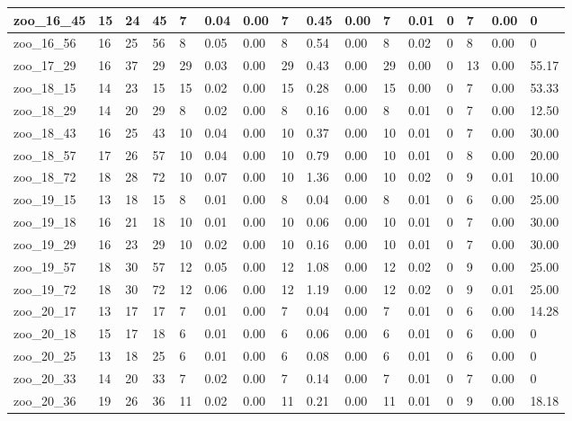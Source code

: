 \begin{landscape}
\begin{longtable}{llllllllllllllll}
zoo\_16\_45 & 15 & 24 & 45 & 7 & 0.04 & 0.00 & 7 & 0.45 & 0.00 & 7 & 0.01 & 0 & 7 & 0.00 & 0 \\ \hline 
zoo\_16\_56 & 16 & 25 & 56 & 8 & 0.05 & 0.00 & 8 & 0.54 & 0.00 & 8 & 0.02 & 0 & 8 & 0.00 & 0 \\ \hline 
zoo\_17\_29 & 16 & 37 & 29 & 29 & 0.03 & 0.00 & 29 & 0.43 & 0.00 & 29 & 0.00 & 0 & 13 & 0.00 & 55.17 \\ \hline 
zoo\_18\_15 & 14 & 23 & 15 & 15 & 0.02 & 0.00 & 15 & 0.28 & 0.00 & 15 & 0.00 & 0 & 7 & 0.00 & 53.33 \\ \hline 
zoo\_18\_29 & 14 & 20 & 29 & 8 & 0.02 & 0.00 & 8 & 0.16 & 0.00 & 8 & 0.01 & 0 & 7 & 0.00 & 12.50 \\ \hline 
zoo\_18\_43 & 16 & 25 & 43 & 10 & 0.04 & 0.00 & 10 & 0.37 & 0.00 & 10 & 0.01 & 0 & 7 & 0.00 & 30.00 \\ \hline 
zoo\_18\_57 & 17 & 26 & 57 & 10 & 0.04 & 0.00 & 10 & 0.79 & 0.00 & 10 & 0.01 & 0 & 8 & 0.00 & 20.00 \\ \hline 
zoo\_18\_72 & 18 & 28 & 72 & 10 & 0.07 & 0.00 & 10 & 1.36 & 0.00 & 10 & 0.02 & 0 & 9 & 0.01 & 10.00 \\ \hline 
zoo\_19\_15 & 13 & 18 & 15 & 8 & 0.01 & 0.00 & 8 & 0.04 & 0.00 & 8 & 0.01 & 0 & 6 & 0.00 & 25.00 \\ \hline 
zoo\_19\_18 & 16 & 21 & 18 & 10 & 0.01 & 0.00 & 10 & 0.06 & 0.00 & 10 & 0.01 & 0 & 7 & 0.00 & 30.00 \\ \hline 
zoo\_19\_29 & 16 & 23 & 29 & 10 & 0.02 & 0.00 & 10 & 0.16 & 0.00 & 10 & 0.01 & 0 & 7 & 0.00 & 30.00 \\ \hline 
zoo\_19\_57 & 18 & 30 & 57 & 12 & 0.05 & 0.00 & 12 & 1.08 & 0.00 & 12 & 0.02 & 0 & 9 & 0.00 & 25.00 \\ \hline 
zoo\_19\_72 & 18 & 30 & 72 & 12 & 0.06 & 0.00 & 12 & 1.19 & 0.00 & 12 & 0.02 & 0 & 9 & 0.01 & 25.00 \\ \hline 
zoo\_20\_17 & 13 & 17 & 17 & 7 & 0.01 & 0.00 & 7 & 0.04 & 0.00 & 7 & 0.01 & 0 & 6 & 0.00 & 14.28 \\ \hline 
zoo\_20\_18 & 15 & 17 & 18 & 6 & 0.01 & 0.00 & 6 & 0.06 & 0.00 & 6 & 0.01 & 0 & 6 & 0.00 & 0 \\ \hline 
zoo\_20\_25 & 13 & 18 & 25 & 6 & 0.01 & 0.00 & 6 & 0.08 & 0.00 & 6 & 0.01 & 0 & 6 & 0.00 & 0 \\ \hline 
zoo\_20\_33 & 14 & 20 & 33 & 7 & 0.02 & 0.00 & 7 & 0.14 & 0.00 & 7 & 0.01 & 0 & 7 & 0.00 & 0 \\ \hline 
zoo\_20\_36 & 19 & 26 & 36 & 11 & 0.02 & 0.00 & 11 & 0.21 & 0.00 & 11 & 0.01 & 0 & 9 & 0.00 & 18.18 \\ \hline 

\end{longtable}
\end{landscape}
